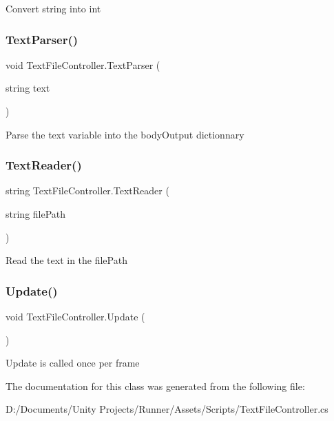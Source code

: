 Convert string into int \mbox{\label{class_text_file_controller_a9d4855b5a0e296eea72c933dc23e8b3a}} 
\subsubsection{\texorpdfstring{Text\+Parser()}{TextParser()}}
{\footnotesize\ttfamily void Text\+File\+Controller.\+Text\+Parser (\begin{DoxyParamCaption}\item[{string}]{text }\end{DoxyParamCaption})\hspace{0.3cm}{\ttfamily [protected]}}

Parse the text variable into the body\+Output dictionnary \mbox{\label{class_text_file_controller_ac6f1c084100c2444e52297bab26329ce}} 
\subsubsection{\texorpdfstring{Text\+Reader()}{TextReader()}}
{\footnotesize\ttfamily string Text\+File\+Controller.\+Text\+Reader (\begin{DoxyParamCaption}\item[{string}]{file\+Path }\end{DoxyParamCaption})\hspace{0.3cm}{\ttfamily [protected]}}

Read the text in the file\+Path \mbox{\label{class_text_file_controller_a1af98165daca71ad66b947454666f98e}} 
\subsubsection{\texorpdfstring{Update()}{Update()}}
{\footnotesize\ttfamily void Text\+File\+Controller.\+Update (\begin{DoxyParamCaption}{ }\end{DoxyParamCaption})\hspace{0.3cm}{\ttfamily [private]}}

Update is called once per frame 

The documentation for this class was generated from the following file\+:\begin{DoxyCompactItemize}
\item 
D\+:/\+Documents/\+Unity Projects/\+Runner/\+Assets/\+Scripts/Text\+File\+Controller.\+cs\end{DoxyCompactItemize}
